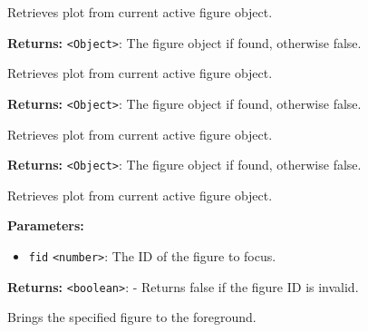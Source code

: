 \documentclass[12pt,a4paper]{article}
\begin{document}
\noindent Retrieves plot from current active figure object.

\vspace{5mm}
\noindent {}


\noindent \textbf{Returns:} \texttt{<Object>}: The figure object if found, otherwise \textasciigrave{}false\textasciigrave{}.

\noindent Retrieves plot from current active figure object.

\vspace{5mm}
\noindent {}


\noindent \textbf{Returns:} \texttt{<Object>}: The figure object if found, otherwise \textasciigrave{}false\textasciigrave{}.

\noindent Retrieves plot from current active figure object.

\vspace{5mm}
\noindent {}


\noindent \textbf{Returns:} \texttt{<Object>}: The figure object if found, otherwise \textasciigrave{}false\textasciigrave{}.

\noindent Retrieves plot from current active figure object.

\vspace{5mm}
\noindent {}


\noindent \textbf{Parameters:}
\begin{itemize}
  \item \texttt{fid} \texttt{<number>}: The ID of the figure to focus.
\end{itemize}

\noindent \textbf{Returns:} \texttt{<boolean>}: - Returns false if the figure ID is invalid.

\noindent Brings the specified figure to the foreground.

\vspace{5mm}
\noindent {}
\end{document}
